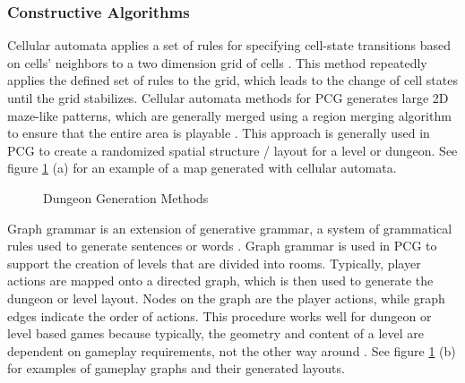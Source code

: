 \documentclass[11pt, oneside]{article}
\begin{document}
\begin{normalsize}
\subsubsection{Constructive Algorithms}
Cellular automata applies a set of rules for specifying cell-state transitions based on cells' neighbors to a two dimension grid of cells \cite{adams2017procedural}. This method repeatedly applies the defined set of rules to the grid, which leads to the change of cell states until the grid stabilizes. Cellular automata methods for PCG generates large 2D maze-like patterns, which are generally merged using a region merging algorithm to ensure that the entire area is playable \cite{adams2017procedural}. This approach is generally used in PCG to create a randomized spatial structure / layout for a level or dungeon. See figure \ref{fig:dungeon} (a) for an example of a map generated with cellular automata.

\begin{figure}[H]%
    \centering
    \qquad
    \caption{Dungeon Generation Methods}%
    \label{fig:dungeon}%
\end{figure}

Graph grammar is an extension of generative grammar, a system of grammatical rules used to generate sentences or words \cite{thompson2017generative}. Graph grammar is used in PCG to support the creation of levels that are divided into rooms. Typically, player actions are mapped onto a directed graph, which is then used to generate the dungeon or level layout. Nodes on the graph are the player actions, while graph edges indicate the order of actions. This procedure works well for dungeon or level based games because typically, the geometry and content of a level are dependent on gameplay requirements, not the other way around \cite{van2013designing}. See figure \ref{fig:dungeon} (b) for examples of gameplay graphs and their generated layouts.


\end{normalsize}
\end{document}
